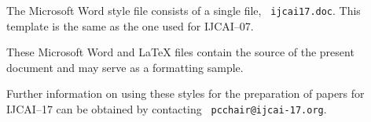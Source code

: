 \documentclass{article}
\begin{document}
The Microsoft Word style file consists of a single file, {\tt
ijcai17.doc}. This template is the same as the one used for
IJCAI--07.

These Microsoft Word and \LaTeX{} files contain the source of the
present document and may serve as a formatting sample.  

Further information on using these styles for the preparation of
papers for IJCAI--17 can be obtained by contacting {\tt
pcchair@ijcai-17.org}.



\end{document}
